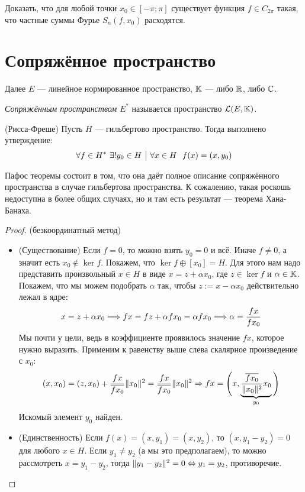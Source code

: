 \begin{exercise}
	Доказать, что для любой точки $x_0 \in [-\pi; \pi]$ существует функция $f \in C_{2\pi}$ такая, что частные суммы Фурье $S_n(f, x_0)$ расходятся.
\end{exercise}

\section{Сопряжённое пространство}

\begin{note}
	Далее $E$ --- линейное нормированное пространство, $\mathbb{K}$ --- либо $\mathbb{R}$, либо $\mathbb{C}$.
\end{note}

\begin{definition}
	\textit{Сопряжённым пространством} $E^*$ называется пространство $\mathcal{L}(E, \mathbb{K})$.
\end{definition}

\begin{theorem} (Рисса-Фреше)
	Пусть $H$ --- гильбертово пространство. Тогда выполнено утверждение:
	\[
		\forall f \in H^*\ \exists! y_0 \in H \ \big|\  \forall x \in H\ \ f(x) = (x, y_0)
	\]
\end{theorem}

\begin{note}
	Пафос теоремы состоит в том, что она даёт полное описание сопряжённого пространства в случае гильбертова пространства. К сожалению, такая роскошь недоступна в более общих случаях, но и там есть результат --- теорема Хана-Банаха.
\end{note}

\begin{proof} (безкоординатный метод)
	\begin{itemize}
		\item (Существование) Если $f = 0$, то можно взять $y_0 = 0$ и всё. Иначе $f \neq 0$, а значит есть $x_0 \notin \ker f$. Покажем, что $\ker f \oplus [x_0] = H$. Для этого нам надо представить произвольный $x \in H$ в виде $x = z + \alpha x_0$, где $z \in \ker f$ и $\alpha \in \mathbb{K}$. Покажем, что мы можем подобрать $\alpha$ так, чтобы $z := x - \alpha x_0$ действительно лежал в ядре:
		\[
			x = z + \alpha x_0 \Longrightarrow fx = fz + \alpha fx_0 = \alpha fx_0 \Longrightarrow \alpha = \frac{fx}{fx_0}
		\]
		Мы почти у цели, ведь в коэффициенте проявилось значение $fx$, которое нужно выразить. Применим к равенству выше слева скалярное произведение с $x_0$:
		\[
			(x, x_0) = (z, x_0) + \frac{fx}{\overline{fx_0}} \|x_0\|^2 = \frac{fx}{\overline{fx_0}} \|x_0\|^2 \Rightarrow fx = \Bigg(x, \underbrace{\frac{\overline{fx_0}}{\|x_0\|^2} x_0}_{y_0}\Bigg)
		\]
		Искомый элемент $y_0$ найден.
		
		\item (Единственность) Если $f(x) = (x, y_1) = (x, y_2)$, то $(x, y_1 - y_2) = 0$ для любого $x \in H$. Если $y_1 \neq y_2$ (а мы это предполагаем), то можно рассмотреть $x = y_1 - y_2$, тогда $\|y_1 - y_2\|^2 = 0 \Leftrightarrow y_1 = y_2$, противоречие.
	\end{itemize}
\end{proof}


